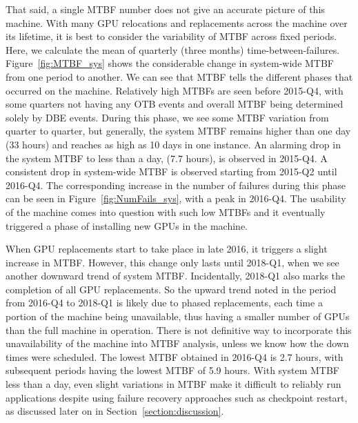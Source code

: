 That said, a single MTBF number does not give an accurate picture of this machine.
With many GPU relocations and replacements across the machine over its lifetime, it is 
best to consider the variability of MTBF across fixed periods. Here, we calculate 
the mean of quarterly (three months) time-between-failures. Figure~\ref{fig:MTBF_sys}
shows the considerable change in system-wide MTBF from one period to another. 
We can see that MTBF tells the different phases that occurred on the machine. 
Relatively high MTBFs are seen before 2015-Q4, with some quarters not having any OTB events 
and overall MTBF being determined solely by DBE events. During this
phase, we see some MTBF variation from quarter to quarter, but
generally, the system MTBF remains higher than one day (33 hours) and reaches as high
as 10 days in one instance. An alarming drop in the system MTBF to less than a day, (7.7 hours), is observed in 2015-Q4.
A consistent drop in system-wide MTBF is observed starting from 2015-Q2 until 2016-Q4. 
The corresponding increase in the number of failures during this phase can be seen in Figure~\ref{fig:NumFails_sys},
with a peak in 2016-Q4. The usability of the machine comes into
question with such low MTBFs and it eventually triggered 
a phase of installing new GPUs in the machine.

When GPU replacements start to take place in late 
2016, it triggers a slight increase in MTBF. However, this change only lasts until 2018-Q1, when we see another 
downward trend of system MTBF. Incidentally, 2018-Q1 also marks the completion of all GPU replacements. 
So the upward trend noted in the period from 2016-Q4 to 2018-Q1 is
likely due to phased replacements, each time a portion of the machine 
being unavailable, thus having a smaller number of GPUs than the full
machine in operation. 
There is not definitive way to incorporate this unavailability of the
machine into MTBF analysis, unless we know how the down times were scheduled.
The lowest MTBF obtained in 2016-Q4 is 2.7 hours, with subsequent periods having the 
lowest MTBF of 5.9 hours. With system MTBF less than a day, even slight variations in MTBF make it 
difficult to reliably run applications despite using failure recovery approaches such as checkpoint restart, 
as discussed later on in Section~\ref{section:discussion}. 

